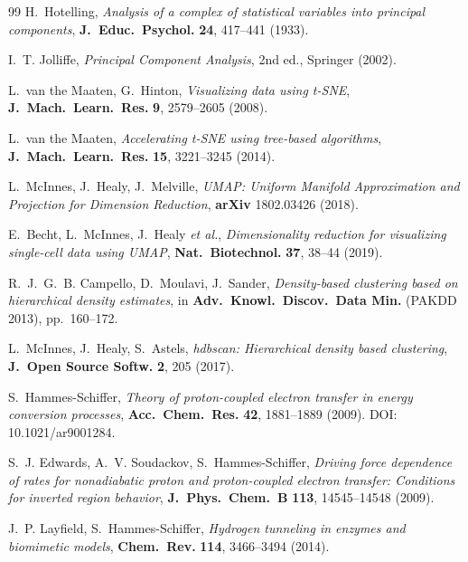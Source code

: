 \documentclass[11pt,a4paper,twoside]{article}
\theoremstyle{remark}
\begin{document}
\begin{thebibliography}{99}
H.~Hotelling,
\emph{Analysis of a complex of statistical variables into principal
components},
\textbf{J.\ Educ.\ Psychol.} \textbf{24}, 417--441 (1933).

I.~T. Jolliffe,
\emph{Principal Component Analysis},
2nd ed., Springer (2002).

L.~van the Maaten, G.~Hinton,
\emph{Visualizing data using t-SNE},
\textbf{J.\ Mach.\ Learn.\ Res.} \textbf{9}, 2579--2605 (2008).

L.~van the Maaten,
\emph{Accelerating t-SNE using tree-based algorithms},
\textbf{J.\ Mach.\ Learn.\ Res.} \textbf{15}, 3221--3245 (2014).

L.~McInnes, J.~Healy, J.~Melville,
\emph{UMAP: Uniform Manifold Approximation and Projection for
Dimension Reduction},
\textbf{arXiv} 1802.03426 (2018).

E.~Becht, L.~McInnes, J.~Healy \emph{et al.},
\emph{Dimensionality reduction for visualizing single-cell data using
UMAP},
\textbf{Nat.\ Biotechnol.} \textbf{37}, 38--44 (2019).

R.~J.~G.~B. Campello, D.~Moulavi, J.~Sander,
\emph{Density-based clustering based on hierarchical density estimates},
in \textbf{Adv.\ Knowl.\ Discov.\ Data Min.} (PAKDD 2013), pp.~160--172.

L.~McInnes, J.~Healy, S.~Astels,
\emph{hdbscan: Hierarchical density based clustering},
\textbf{J.\ Open Source Softw.} \textbf{2}, 205 (2017).


S.~Hammes-Schiffer,
\emph{Theory of proton-coupled electron transfer in energy conversion
processes},
\textbf{Acc.\ Chem.\ Res.} \textbf{42}, 1881--1889 (2009).
DOI: 10.1021/ar9001284.

S.~J. Edwards, A.~V. Soudackov, S.~Hammes-Schiffer,
\emph{Driving force dependence of rates for nonadiabatic proton and
proton-coupled electron transfer: Conditions for inverted region behavior},
\textbf{J.\ Phys.\ Chem.\ B} \textbf{113}, 14545--14548 (2009).

J.~P. Layfield, S.~Hammes-Schiffer,
\emph{Hydrogen tunneling in enzymes and biomimetic models},
\textbf{Chem.\ Rev.} \textbf{114}, 3466--3494 (2014).


\end{thebibliography}
\end{document}
